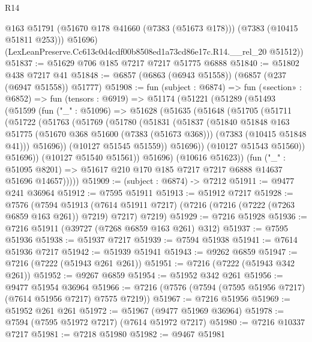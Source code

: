 \begin{lexlean}{R14}
\begin{coremodule}
          @163
          @51791
          (@51670 @178 @41660 (@7383 (@51673 @178)))
          (@7383 (@10415 @51811 @253)))
        @51696)
      (LexLeanPreserve.Cc613c0d4cdf00b8508ed1a73cd86e17c.R14.__rel_20 @51512))
@51837 := @51629 @706 @185 @7217 @7217 @51775 @6888
@51840 := @51802 @438 @7217 @41
@51848 := @6857 (@6863 (@6943 @51558)) (@6857 (@237 (@6947 @51558)) @51777)
@51908 := fun (subject : @6874) =>
  fun («section» : @6852) =>
  fun (tensors : @6919) =>
  @51174
    (@51221
      (@51289
        (@51493
          (@51599
            (fun ("_" : @51096) =>
            @51628
              (@51635
                (@51648
                  (@51705
                    (@51711
                      (@51722
                        (@51763
                          (@51769
                            (@51780
                              (@51831
                                (@51837
                                  (@51840
                                    @51848
                                    @163
                                    @51775
                                    (@51670 @368 @51600 (@7383 (@51673 @368)))
                                    (@7383 (@10415 @51848 @41)))
                                  @51696))
                              (@10127 @51545 @51559))
                            @51696))
                        (@10127 @51543 @51560))
                      @51696))
                  (@10127 @51540 @51561))
                @51696)
              (@10616 @51623))
            (fun ("_" : @51095 @8201) =>
            @51617 @210 @170 @185 @7217 @7217 @6888 @14637 @51696 @14657)))))
@51909 := (subject : @6874) -> @7212
@51911 := @9477 @241 @36964
@51912 := @7595 @51911
@51913 := @51912 @7217
@51928 := @7576
    (@7594
      @51913
      (@7614 @51911 @7217)
      (@7216 (@7216 (@7222 (@7263 @6859 @163 @261)) @7219) @7217)
      @7219)
@51929 := @7216 @51928
@51936 := @7216 @51911 (@39727 (@7268 @6859 @163 @261) @312)
@51937 := @7595 @51936
@51938 := @51937 @7217
@51939 := @7594 @51938
@51941 := @7614 @51936 @7217
@51942 := @51939 @51941
@51943 := @9262 @6859
@51947 := @7216 (@7222 (@51943 @261 @261))
@51951 := @7216 (@7222 (@51943 @342 @261))
@51952 := @9267 @6859
@51954 := @51952 @342 @261
@51956 := @9477 @51954 @36964
@51966 := @7216 (@7576 (@7594 (@7595 @51956 @7217) (@7614 @51956 @7217) @7575 @7219))
@51967 := @7216 @51956
@51969 := @51952 @261 @261
@51972 := @51967 (@9477 @51969 @36964)
@51978 := @7594 (@7595 @51972 @7217) (@7614 @51972 @7217)
@51980 := @7216 @10337 @7217
@51981 := @7218 @51980
@51982 := @9467 @51981

\end{coremodule}
\end{lexlean}
